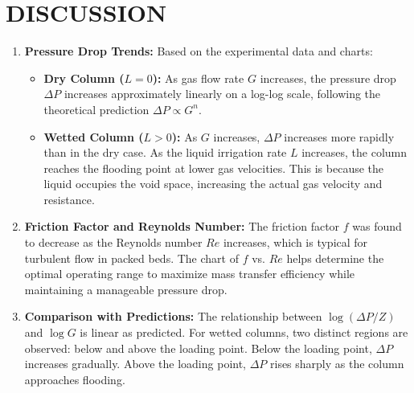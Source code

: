 \section{DISCUSSION}

\begin{enumerate}
    \item \textbf{Pressure Drop Trends:}
    Based on the experimental data and charts:
    \begin{itemize}
        \item \textbf{Dry Column ($L=0$):} As gas flow rate $G$ increases, the pressure drop $\Delta P$ increases approximately linearly on a log-log scale, following the theoretical prediction $\Delta P \propto G^n$.
        \item \textbf{Wetted Column ($L>0$):} As $G$ increases, $\Delta P$ increases more rapidly than in the dry case. As the liquid irrigation rate $L$ increases, the column reaches the flooding point at lower gas velocities. This is because the liquid occupies the void space, increasing the actual gas velocity and resistance.
    \end{itemize}

    \item \textbf{Friction Factor and Reynolds Number:}
    The friction factor $f$ was found to decrease as the Reynolds number $Re$ increases, which is typical for turbulent flow in packed beds. The chart of $f$ vs. $Re$ helps determine the optimal operating range to maximize mass transfer efficiency while maintaining a manageable pressure drop.

    \item \textbf{Comparison with Predictions:}
    The relationship between $\log(\Delta P/Z)$ and $\log G$ is linear as predicted. For wetted columns, two distinct regions are observed: below and above the loading point. Below the loading point, $\Delta P$ increases gradually. Above the loading point, $\Delta P$ rises sharply as the column approaches flooding.


\end{enumerate}
